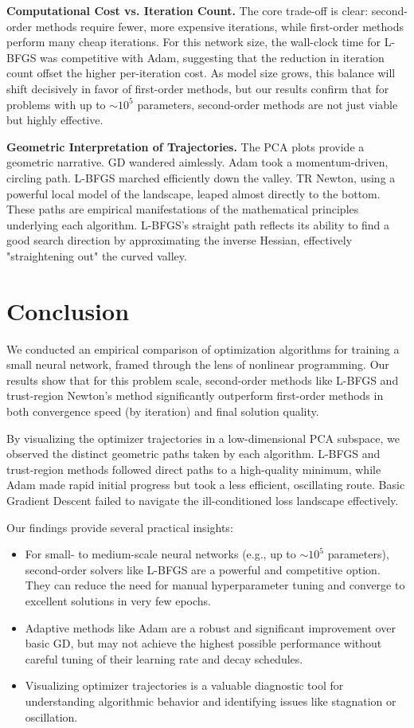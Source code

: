 \documentclass[20pt]{article}
\begin{document}
\textbf{Computational Cost vs. Iteration Count.} The core trade-off is clear: second-order methods require fewer, more expensive iterations, while first-order methods perform many cheap iterations. For this network size, the wall-clock time for L-BFGS was competitive with Adam, suggesting that the reduction in iteration count offset the higher per-iteration cost. As model size grows, this balance will shift decisively in favor of first-order methods, but our results confirm that for problems with up to $\sim 10^5$ parameters, second-order methods are not just viable but highly effective.

\textbf{Geometric Interpretation of Trajectories.} The PCA plots provide a geometric narrative. GD wandered aimlessly. Adam took a momentum-driven, circling path. L-BFGS marched efficiently down the valley. TR Newton, using a powerful local model of the landscape, leaped almost directly to the bottom. These paths are empirical manifestations of the mathematical principles underlying each algorithm. L-BFGS's straight path reflects its ability to find a good search direction by approximating the inverse Hessian, effectively "straightening out" the curved valley.

\clearpage

\section{Conclusion} \label{conclusion}
We conducted an empirical comparison of optimization algorithms for training a small neural network, framed through the lens of nonlinear programming. Our results show that for this problem scale, second-order methods like L-BFGS and trust-region Newton's method significantly outperform first-order methods in both convergence speed (by iteration) and final solution quality.

By visualizing the optimizer trajectories in a low-dimensional PCA subspace, we observed the distinct geometric paths taken by each algorithm. L-BFGS and trust-region methods followed direct paths to a high-quality minimum, while Adam made rapid initial progress but took a less efficient, oscillating route. Basic Gradient Descent failed to navigate the ill-conditioned loss landscape effectively.

Our findings provide several practical insights:
\begin{itemize}
    \item For small- to medium-scale neural networks (e.g., up to $\sim 10^5$ parameters), second-order solvers like L-BFGS are a powerful and competitive option. They can reduce the need for manual hyperparameter tuning and converge to excellent solutions in very few epochs.
    \item Adaptive methods like Adam are a robust and significant improvement over basic GD, but may not achieve the highest possible performance without careful tuning of their learning rate and decay schedules.
    \item Visualizing optimizer trajectories is a valuable diagnostic tool for understanding algorithmic behavior and identifying issues like stagnation or oscillation.
\end{itemize}
\end{document}
